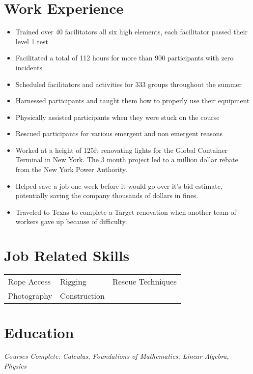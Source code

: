 \documentclass{my_resume}
\begin{document}
	\centerheader
	\section{Work Experience}
	
			\begin{itemize}
				\item Trained over 40 facilitators all six high elements, each facilitator passed their level 1 test
				\item Facilitated a total of 112 hours for more than 900 participants with zero incidents
				\item Scheduled facilitators and activities for 333 groups throughout the summer
			\end{itemize}
	
			\begin{itemize}
				\item Harnessed participants and taught them how to properly use their equipment
				\item Physically assisted participants when they were stuck on the course
				\item Rescued participants for various emergent and non emergent reasons
			\end{itemize}
	
			\begin{itemize}
				\item Worked at a height of 125ft renovating lights for the Global Container Terminal in New York. The 3 month project led to a million dollar rebate from the New York Power Authority.
				\item Helped save a job one week before it would go over it's bid estimate, potentially saving the company thousands of dollars in fines.
				\item Traveled to Texas to complete a Target renovation when another team of workers gave up because of difficulty.
			\end{itemize}

	\section{Job Related Skills}
		\begin{tabular}{l l l}
			Rope Access & Rigging & Rescue Techniques \\
			Photography & Construction
		\end{tabular}
	
	\section{Education}
		\scriptsize{\textit{Courses Complete: Calculus, Foundations of Mathematics, Linear Algebra, Physics}}
\end{document}
